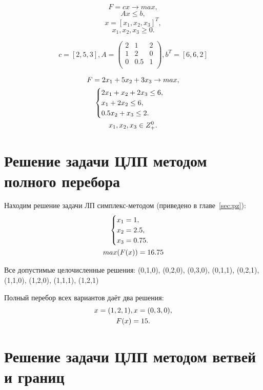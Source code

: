 \documentclass[12pt,a4paper,oneside]{extarticle}
\begin{document}
    $$F = cx \rightarrow max,$$
    $$Ax \leq b,$$ 
    $$x = [x_1, x_2, x_3]^T,$$
    $$x_1, x_2, x_3 \geq 0.$$

    $$c = [2, 5, 3], 
    A = \begin{pmatrix}
        2 & 1 & 2\\
        1 & 2 & 0\\
        0 & 0.5 & 1\\
    \end{pmatrix}, 
    b^T = [6, 6, 2]$$

    \begin{gather}
        F = 2x_1+5x_2+3x_3 \rightarrow max,  \notag  \\
        \begin{cases}
            2x_1 + x_2 + 2x_3 \leq 6, \\
            x_1 + 2x_2 \leq 6, \\
            0.5x_2 + x_3 \leq 2.
        \end{cases} \notag \\
        x_1, x_2, x_3 \in Z^0_+. \notag
    \end{gather} 


\section{Решение задачи ЦЛП методом полного перебора}
    Находим решение задачи ЛП симплекс-методом (приведено в главе~\ref{sec:pz}):
    \begin{gather}
        \begin{cases}
            x_1 = 1,\\
            x_2 = 2.5, \\
            x_3 = 0.75. \\
        \end{cases} \notag \\
        max (F(x)) = 16.75 \notag 
    \end{gather}

    Все допустимые целочисленные решения:
    (0,1,0), (0,2,0), (0,3,0), (0,1,1), (0,2,1), 
    (1,1,0), (1,2,0), (1,1,1), (1,2,1)

    Полный перебор всех вариантов даёт два решения:
    \begin{gather}
        x = (1,2,1), x = (0,3,0), \notag \\
        F(x) = 15. \notag
    \end{gather}
\section{Решение задачи ЦЛП методом ветвей и границ}
\end{document}
